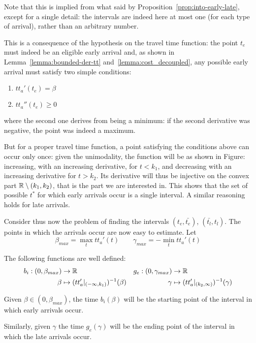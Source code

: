 Note that this is implied from what said by Proposition~\ref{prop:into-early-late},
except for a single detail:
the intervals are indeed here at most one (for each type of arrival), rather than an arbitrary number.

This is a consequence of the hypothesis on the travel time function:
the point \(t_e\) must indeed be an eligible early arrival and,
as shown in Lemma~\ref{lemma:bounded-der-tt} and~\ref{lemma:cost_decoupled},
any possible early arrival must satisfy two simple conditions:
\begin{enumerate}
\item \(tt_a'(t_e) = \beta\)
\item \(tt_a''(t_e) \geq 0\)
\end{enumerate}
where the second one derives from being a minimum:
if the second derivative was negative, the point was indeed a maximum.

But for a proper travel time function,
a point satisfying the conditions above can occur only once:
given the unimodality,
the function will be as shown in Figure: increasing, with an increasing derivative,
for \(t < k_1\), and decreasing with an increasing derivative for \(t > k_2\).
Its derivative will thus be injective on the convex part \(\mathbb{R} \setminus (k_1, k_2)\),
that is the part we are interested in.
This shows that the set of possible \(t^*\) for which early arrivals occur is a single interval.
A similar reasoning holds for late arrivals.

Consider thus now the problem of finding the intervals \((t_e, \bar{t_e})\), \((\bar{t_l}, t_l)\).
The points in which the arrivals occur are now easy to estimate. Let
\begin{equation*}
  \beta_{max} = \max_t tt_a'(t)\qquad \gamma_{max} = -\min_t tt_a'(t)
\end{equation*}

The following functions are well defined:
\begin{align*}
  b_i: (0, \beta_{max}) & \rightarrow \mathbb{R}  & g_e: (0, \gamma_{max}) & \rightarrow \mathbb{R} \\
       \beta & \mapsto (tt_a' |_{(-\infty, k_1)})^{-1}(\beta) & \gamma & \mapsto(tt_a' |_{(k_2, \infty)})^{-1}(\gamma)
\end{align*}

Given \(\beta \in (0, \beta_{max})\),
the time \(b_i(\beta)\) will be the starting point of the interval in which early arrivals occur.

Similarly, given \(\gamma\) the time \(g_e(\gamma)\) will be the ending point of the interval in which the late arrivals occur.

